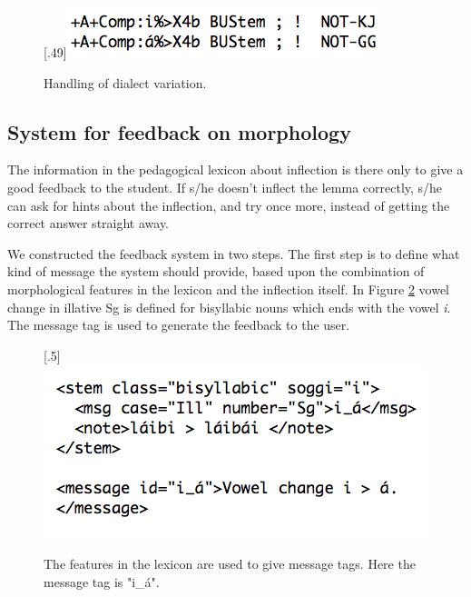 \documentclass[11pt]{article}
\begin{document}
\begin{figure}[htbp]
\begin{center}
\scalebox{.49}[.49]{\includegraphics{presentation/img/smelex3.png}}\\
\caption{Handling of dialect variation.}
\label{smelex}
\end{center}
\end{figure}

\subsection{System for feedback on morphology}\label{mfeedback}

The information in the pedagogical lexicon about inflection is there only to give a good feedback to the student. If s/he doesn't inflect the lemma correctly, s/he can ask for hints about the inflection, and try once more, instead of getting the correct answer straight away. 

We constructed the feedback system in two steps. The first step is to define what kind of message the system should provide, based upon the combination of morphological features in the lexicon and the inflection itself. In Figure \ref{feedbacknouns} vowel change in illative Sg is defined for bisyllabic nouns which ends with the vowel \textit{i}. The message tag is used to generate the feedback to the user. 

\begin{figure}[htbp]
\begin{center}
\scalebox{.5}[.5]{\includegraphics{presentation/img/morphfeedbackEng.png}}\\
\caption{The features in the lexicon are used to give message tags. Here the message tag is "i\_á".}
\label{feedbacknouns}
\end{center}
\end{figure}
\end{document}
